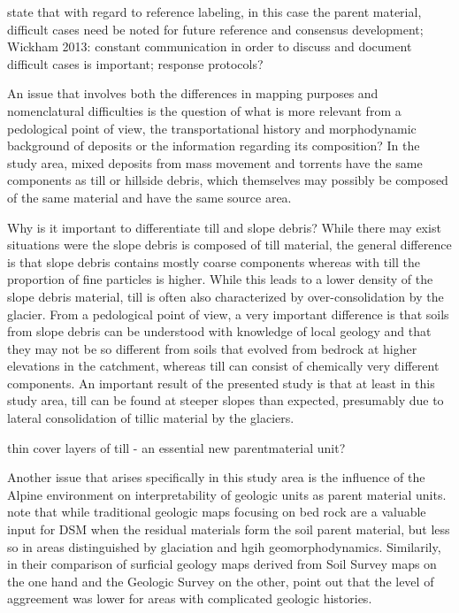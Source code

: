 \documentclass[preprint,12pt,authoryear]{elsarticle}
\begin{document}
 
\cite{Olofsson2013} state that with regard to reference labeling, in this case the parent material, difficult cases need be noted for future reference and consensus development; Wickham 2013: constant communication in order to discuss and document difficult cases is important; response protocols?





An issue that involves both the differences in mapping purposes and nomenclatural difficulties is the question of what is more relevant from a pedological point of view,  the transportational history and morphodynamic background of deposits  or the information regarding its composition? 
In the study area, mixed deposits from mass movement and torrents have the same components as till or hillside debris, which themselves may possibly be composed of the same material and have the same source area.

Why is it important to differentiate till and slope debris? While there may exist situations were the slope debris is composed of till material, the general difference is that slope debris contains mostly coarse components whereas with till the proportion of fine particles is higher. While this leads to a lower density of the slope debris material, till is often also characterized by over-consolidation by the glacier. From a pedological point of view, a very important difference is that soils from slope debris can be understood with knowledge of local geology and that they may not be so different from soils  that evolved from bedrock at higher elevations  in the catchment, whereas till can consist of chemically very different components. An important result of the presented study is that at least in this study area, till can be found at steeper slopes than expected, presumably due to lateral consolidation of tillic material by the glaciers. 

thin cover layers of till - an essential new parentmaterial unit?

Another issue that arises specifically in this study area is the influence of the Alpine environment on interpretability of geologic units as parent material units. \cite{Heung2014} note that while traditional geologic maps focusing on bed rock are a valuable input for DSM when the residual materials form the soil parent material, but less so in areas distinguished by glaciation and hgih geomorphodynamics. Similarily, in their comparison of surficial geology maps derived from Soil Survey maps on the one hand and the Geologic Survey on the other, \cite{Miller2015a} point out that the level of aggreement was lower for areas with complicated geologic histories.
\end{document}
